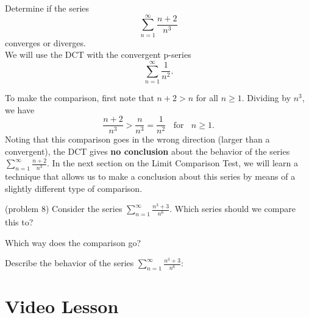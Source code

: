\documentclass[handout]{ximera}
\begin{document}
\begin{example}[example 8] %
Determine if the series 
\[
\sum_{n=1}^\infty \frac{n+2}{n^3}
\]
 converges or diverges.\\
We will use the DCT with the convergent p-series 
\[
\sum_{n=1}^\infty \frac{1}{n^2}.
\]

To make the comparison, first note that $ n+2 > n$ for all $n \geq 1$. Dividing by $n^3$,
we have 
\[
\frac{n+2}{n^3} > \frac{n}{n^3} = \frac{1}{n^2} \; \; \text{ for } \; \; n \geq 1.
\]
Noting that this comparison goes in the wrong direction (larger than a convergent), the DCT gives \textbf{no conclusion}
about the behavior of the series $\sum_{n=1}^\infty \frac{n+2}{n^3}$. In the next section on the Limit Comparison Test, 
we will learn a technique that allows us to make a conclusion about this series by means of a slightly different type of comparison.
\end{example}



\begin{problem}(problem 8)
Consider the series $\displaystyle{\sum_{n=1}^\infty \frac{n^3 +3}{n^6}}$.
Which series should we compare this to?

\begin{multipleChoice}
\end{multipleChoice}

Which way does the comparison go?
\begin{multipleChoice}
\end{multipleChoice}

Describe the behavior of the series $\sum_{n=1}^\infty \frac{n^3+3}{n^6}:$
\begin{multipleChoice}
\end{multipleChoice}

\end{problem}





\section{Video Lesson}
\end{document}
